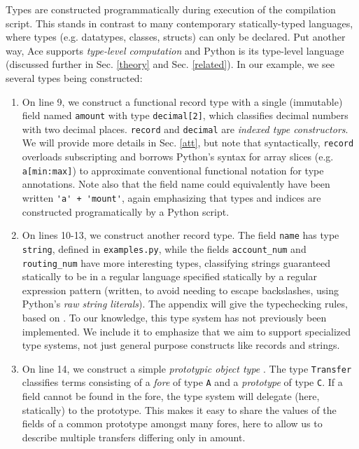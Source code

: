 \documentclass[10pt,preprint]{sigplanconf}
\begin{document}
Types are constructed programmatically during execution of the compilation script. This stands in contrast to many  contemporary statically-typed languages, where types (e.g. datatypes, classes, structs) can only be declared. Put another way, Ace supports \emph{type-level computation} and Python is its type-level language (discussed further in Sec. \ref{theory} and Sec. \ref{related}). 
In our example, we see several types being constructed:
\begin{enumerate}
\item On line 9, we construct a functional record type with a single (immutable) field named \verb|amount| with type \verb|decimal[2]|, which classifies decimal numbers with two decimal places. \verb|record| and \verb|decimal| are \emph{indexed type constructors}. We will provide more details in Sec. \ref{att}, but note that syntactically, \verb|record| overloads subscripting and borrows Python's syntax for array slices (e.g. \verb|a[min:max]|) to approximate conventional functional notation for type annotations. Note also that the field name could equivalently have been written \lstinline{'a' + 'mount'}, again emphasizing that types and indices are constructed programatically by a Python script.
\item On lines 10-13, we construct another record type. The field \verb|name| has type \verb|string|, defined in \verb|examples.py|, while the fields \verb|account_num| and \verb|routing_num| have more interesting types, classifying strings guaranteed statically to be in a regular language specified statically by a  regular expression pattern (written, to avoid needing to escape backslashes, using Python's \emph{raw string literals}). The appendix will give the typechecking rules, based on \cite{fulton-thesis}. To our knowledge, this type system has not previously been implemented. We include it to emphasize that we aim to support specialized type systems,  not just general purpose constructs like records and strings.
\item 
On line 14, we construct a simple \emph{prototypic object type} \cite{Lie86}. The type \verb|Transfer| classifies terms consisting of a \emph{fore} of type \verb|A| and a \emph{prototype} of type \verb|C|. If a field cannot be found in the fore, the type system will delegate (here, statically) to the prototype. This makes it easy to share the values of the fields of a common prototype amongst many fores, here to allow us to describe multiple transfers differing only in amount.
\end{enumerate}
\end{document}
